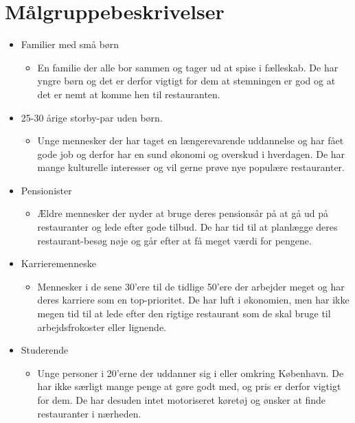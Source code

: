 \documentclass[a4paper, 12pt]{article}
\begin{document}
\section{Målgruppebeskrivelser}
\label{sec:Maalgruppebeskrivelser}

\begin{itemize}
  \item Familier med små børn
  \begin{itemize}
    \item En familie der alle bor sammen og tager ud at spise i fælleskab. De har yngre børn og det er derfor vigtigt for dem at stemningen er god og at det er nemt at komme hen til restauranten.
  \end{itemize}
  \item 25-30 årige storby-par uden børn.
  \begin{itemize}
    \item Unge mennesker der har taget en længerevarende uddannelse og har fået gode job og derfor har en sund økonomi og overskud i hverdagen. De har mange kulturelle interesser og vil gerne prøve nye populære restauranter.
  \end{itemize}
  \item Pensionister
 \begin{itemize}
    \item Ældre mennesker der nyder at bruge deres pensionsår på at gå ud på restauranter og lede efter gode tilbud. De har tid til at planlægge deres restaurant-besøg nøje og går efter at få meget værdi for pengene.
  \end{itemize}
  \item Karrieremenneske
 \begin{itemize}
    \item Mennesker i de sene 30'ere til de tidlige 50'ere der arbejder meget og har deres karriere som en top-prioritet. De har luft i økonomien, men har ikke megen tid til at lede efter den rigtige restaurant som de skal bruge til arbejdsfrokoster eller lignende.
  \end{itemize}
  \item Studerende
 \begin{itemize}
    \item Unge personer i 20'erne der uddanner sig i eller omkring
      København. De har ikke særligt mange penge at gøre godt med, og
      pris er derfor vigtigt for dem. De har desuden intet motoriseret
      køretøj og ønsker at finde restauranter i nærheden.
  \end{itemize}
\end{itemize}
\end{document}
